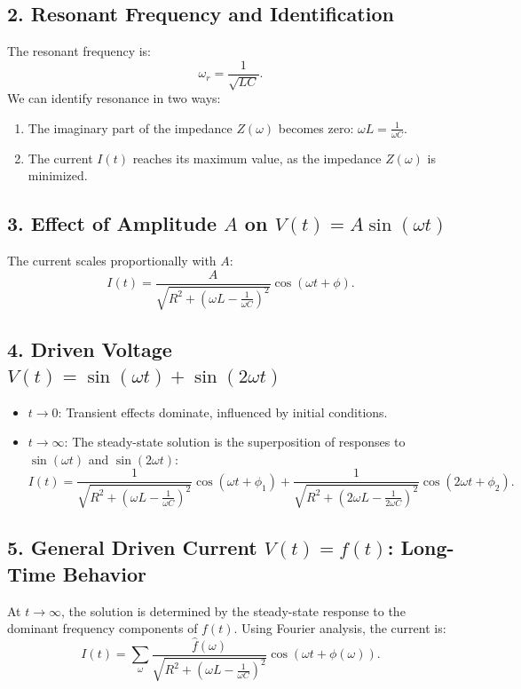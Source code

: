 \documentclass[a4paper,11pt]{article}
\begin{document}
\subsection*{2. Resonant Frequency and Identification}
The resonant frequency is:
\[
\omega_r = \frac{1}{\sqrt{LC}}.
\]
We can identify resonance in two ways:
\begin{enumerate}
    \item The imaginary part of the impedance \(Z(\omega)\) becomes zero: \(\omega L = \frac{1}{\omega C}\).
    \item The current \(I(t)\) reaches its maximum value, as the impedance \(Z(\omega)\) is minimized.
\end{enumerate}

\subsection*{3. Effect of Amplitude \(A\) on \(V(t) = A \sin(\omega t)\)}
The current scales proportionally with \(A\):
\[
I(t) = \frac{A}{\sqrt{R^2 + \left(\omega L - \frac{1}{\omega C}\right)^2}} \cos(\omega t + \phi).
\]

\subsection*{4. Driven Voltage \(V(t) = \sin(\omega t) + \sin(2\omega t)\)}
\begin{itemize}
    \item \(t \to 0\): Transient effects dominate, influenced by initial conditions.
    \item \(t \to \infty\): The steady-state solution is the superposition of responses to \(\sin(\omega t)\) and \(\sin(2\omega t)\):
    \[
    I(t) = \frac{1}{\sqrt{R^2 + \left(\omega L - \frac{1}{\omega C}\right)^2}} \cos(\omega t + \phi_1) + \frac{1}{\sqrt{R^2 + \left(2\omega L - \frac{1}{2\omega C}\right)^2}} \cos(2\omega t + \phi_2).
    \]
\end{itemize}

\subsection*{5. General Driven Current \(V(t) = f(t)\): Long-Time Behavior}
At \(t \to \infty\), the solution is determined by the steady-state response to the dominant frequency components of \(f(t)\). Using Fourier analysis, the current is:
\[
I(t) = \sum_{\omega} \frac{\hat{f}(\omega)}{\sqrt{R^2 + \left(\omega L - \frac{1}{\omega C}\right)^2}} \cos(\omega t + \phi(\omega)).
\]
\end{document}
